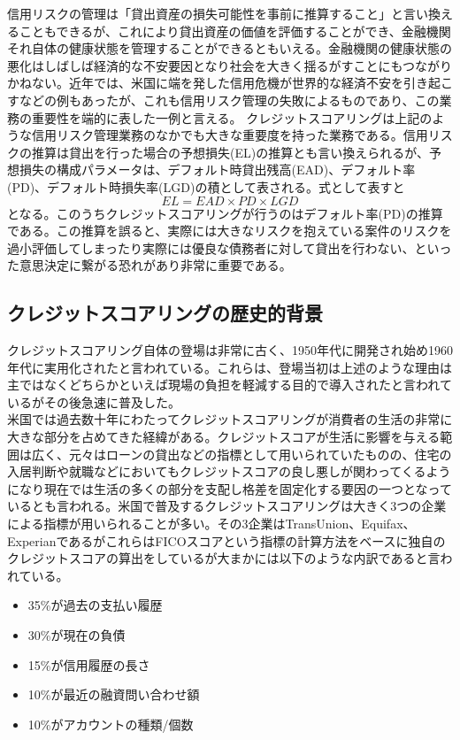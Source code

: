 \documentclass[11pt]{jsarticle}
\providecommand{\tightlist}{%
      \setlength{\itemsep}{0pt}\setlength{\parskip}{0pt}}
\begin{document}
信用リスクの管理は「貸出資産の損失可能性を事前に推算すること」と言い換えることもできるが\cite{risk-management}、これにより貸出資産の価値を評価することができ、金融機関それ自体の健康状態を管理することができるともいえる。金融機関の健康状態の悪化はしばしば経済的な不安要因となり社会を大きく揺るがすことにもつながりかねない。近年では、米国に端を発した信用危機が世界的な経済不安を引き起こすなどの例もあったが、これも信用リスク管理の失敗によるものであり、この業務の重要性を端的に表した一例と言える。
    クレジットスコアリングは上記のような信用リスク管理業務のなかでも大きな重要度を持った業務である。信用リスクの推算は貸出を行った場合の予想損失(EL)の推算とも言い換えられるが、予想損失の構成パラメータは、デフォルト時貸出残高(EAD)、デフォルト率(PD)、デフォルト時損失率(LGD)の積として表される。式として表すと
\[
  EL = EAD \times PD \times LGD
\]
となる。このうちクレジットスコアリングが行うのはデフォルト率(PD)の推算である。この推算を誤ると、実際には大きなリスクを抱えている案件のリスクを過小評価してしまったり実際には優良な債務者に対して貸出を行わない、といった意思決定に繋がる恐れがあり非常に重要である。

    \subsection{クレジットスコアリングの歴史的背景}\label{ux30afux30ecux30b8ux30c3ux30c8ux30b9ux30b3ux30a2ux30eaux30f3ux30b0ux306eux6b74ux53f2ux7684ux80ccux666f}
クレジットスコアリング自体の登場は非常に古く、1950年代に開発され始め1960年代に実用化されたと言われている\cite{perspective}。これらは、登場当初は上述のような理由は主ではなくどちらかといえば現場の負担を軽減する目的で導入されたと言われているがその後急速に普及した。\\

米国では過去数十年にわたってクレジットスコアリングが消費者の生活の非常に大きな部分を占めてきた経緯がある\cite{credit-scoring-in-us}。クレジットスコアが生活に影響を与える範囲は広く、元々はローンの貸出などの指標として用いられていたものの、住宅の入居判断や就職などにおいてもクレジットスコアの良し悪しが関わってくるようになり現在では生活の多くの部分を支配し格差を固定化する要因の一つとなっているとも言われる。米国で普及するクレジットスコアリングは大きく3つの企業による指標が用いられることが多い。その3企業はTransUnion、Equifax、ExperianであるがこれらはFICOスコアという指標の計算方法をベースに独自のクレジットスコアの算出をしている\cite{annuity}が大まかには以下のような内訳であると言われている。
    \begin{itemize}
\tightlist
\item
  35\%が過去の支払い履歴
\item
  30\%が現在の負債
\item
  15\%が信用履歴の長さ
\item
  10\%が最近の融資問い合わせ額
\item
  10\%がアカウントの種類/個数
\end{itemize}
\end{document}

